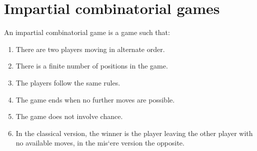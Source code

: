\section{Impartial combinatorial games}

\begin{definition}
    An impartial combinatorial game is a game such that:
    \begin{enumerate}
        \item There are two players moving in alternate order.
        \item There is a finite number of positions in the game.
        \item The players follow the same rules.
        \item The game ends when no further moves are possible.
        \item The game does not involve chance.
        \item In the classical version, the winner is the player leaving the other player with no available moves, in the mis`ere version the opposite.
    \end{enumerate}
\end{definition}



